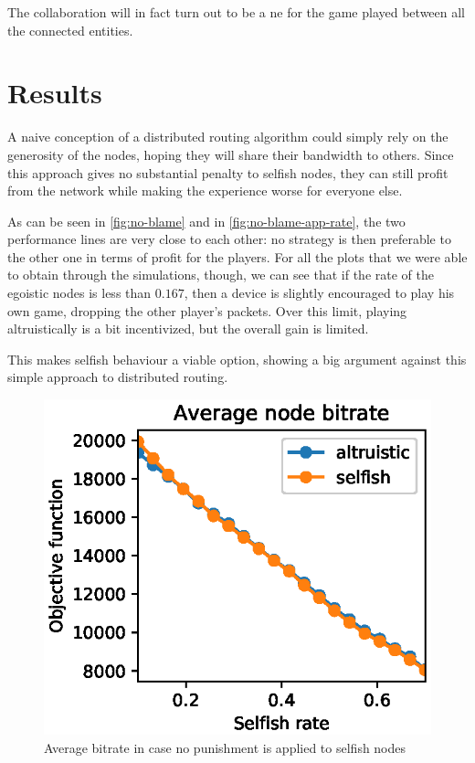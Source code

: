 \documentclass[conference]{IEEEtran}
\begin{document}
The collaboration will in fact turn out to be a \gls{ne} for the game played between all the connected entities.

\clearpage
\section{Results} \label{sec:results}


A naive conception of a distributed routing algorithm could simply rely on the generosity of the nodes, hoping they will share their bandwidth to others.
Since this approach gives no substantial penalty to selfish nodes, they can still profit from the network while making the experience worse for everyone else.

As can be seen in \autoref{fig:no-blame} and in \autoref{fig:no-blame-app-rate}, the two performance lines are very close to each other: no strategy is then  preferable to the other one in terms of profit for the players. For all the plots that we were able to obtain through the simulations, though, we can see that if the rate of the egoistic nodes is less than $0.167$, then a device is slightly encouraged to play his own game, dropping the other player's packets.
Over this limit, playing altruistically is a bit incentivized, but the overall gain is limited.

This makes selfish behaviour a viable option, showing a big argument against this simple approach to distributed routing.

\begin{figure}[h]
  \includegraphics{figures/obj_func_vs_selfish_rate_no_punish.eps}
  \caption{Average bitrate in case no punishment is applied to selfish nodes}
  \label{fig:no-blame}
\end{figure}
\end{document}
